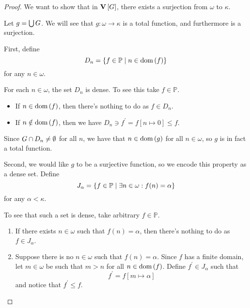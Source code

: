\documentclass[11pt]{article}
\renewcommand{\P}{\mathbb{P}}
\begin{document}
\begin{proof}
    \newcommand{\m}{\verum[G]}
    We want to show that in $\m$, there exists a surjection from $\omega$ to
    $\kappa$.

    Let $g = \bigcup G$.
    We will see that $g : \omega \to \kappa$ is a total function, and
    furthermore is a surjection.

    First, define
    \begin{equation*}
        D_n = \setof{ f \in \P \sth n \in \dom{f} }
    \end{equation*}
    for any $n \in \omega$.

    For each $n \in \omega$, the set $D_n$ is dense.
    To see this take $f \in \P$.
    \begin{itemize}
        \item
            If $n \in \operatorname{dom}{\left(f\right)}$, then there's nothing to do as $f \in D_n$.
        \item
            If $n \notin \operatorname{dom}{\left(f\right)}$,
            then we have $D_n \ni f^\prime = f[n \mapsto 0] \leq f$.
    \end{itemize}

    Since $G \cap D_n \neq \emptyset$ for all $n$, we have that
    $n \in \operatorname{dom}{\left(g\right)}$ for all $n \in \omega$, so $g$ is in fact a total function.

    Second, we would like $g$ to be a surjective function, so we encode this
    property as a dense set.
    Define
    \begin{equation*}
        J_{\alpha} = \setof{
            f \in \P \sth \exists n \in \omega : f(n) = \alpha
        }
    \end{equation*}
    for any $\alpha < \kappa$.

    To see that such a set is dense, take arbitrary $f \in \P$.
    \begin{enumerate}
        \item
            If there exists $n \in \omega$ such that $f(n) = \alpha$,
            then there's nothing to do as $f \in J_\alpha$.
        \item
            Suppose there is no $n \in \omega$ such that $f(n) = \alpha$.
            Since $f$ has a finite domain, let $m \in \omega$ be such that
            $m > n$ for all $n \in \operatorname{dom}{\left(f\right)}$.
            Define $f^\prime \in J_{\alpha}$ such that
            \begin{equation*}
                f^\prime = f[m \mapsto \alpha]
            \end{equation*}
            and notice that $f^\prime \leq f$.
    \end{enumerate}


\end{proof}
\end{document}
